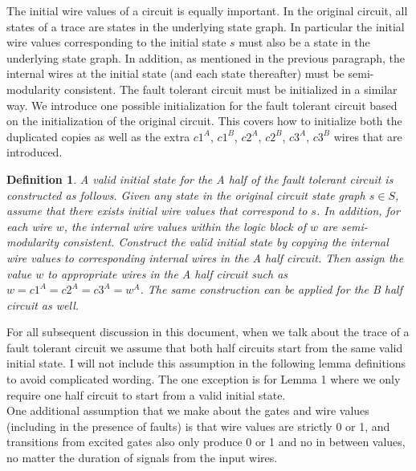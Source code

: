\documentclass[12pt]{report}
\newtheorem*{definition}{Definition}
\begin{document}
The initial wire values of a circuit is equally important.  In the original circuit, all states of a trace are states in the underlying state graph.  In particular the initial wire values corresponding to the initial state $s$ must also be a state in the underlying state graph.  In addition, as mentioned in the previous paragraph, the internal wires at the initial state (and each state thereafter) must be semi-modularity consistent.   The fault tolerant circuit must be initialized in a similar way.  We introduce one possible initialization for the fault tolerant circuit based on the initialization of the original circuit.  This covers how to initialize both the duplicated copies as well as the extra $c1^A$, $c1^B$, $c2^A$, $c2^B$, $c3^A$, $c3^B$ wires that are introduced.
\begin{definition} A {\em valid initial state} for the A half of the fault tolerant circuit is constructed as follows.  Given any state in the original circuit state graph $s \in S$, assume that there exists initial wire values that correspond to $s$.  In addition, for each wire $w$, the internal wire values within the logic block of $w$ are semi-modularity consistent.  Construct the valid initial state by copying the internal wire values to corresponding internal wires in the A half circuit.  Then assign the value $w$ to appropriate wires in the A half circuit such as $w=c1^A=c2^A=c3^A=w^A$. The same construction can be applied for the B half circuit as well.
\end{definition}
For all subsequent discussion in this document, when we talk about the trace of a fault tolerant circuit we assume that both half circuits start from the same valid initial state.  I will not include this assumption in the following lemma definitions to avoid complicated wording.  %
The one exception is for Lemma 1 where we only require one half circuit to start from a valid initial state.  \\

One additional assumption that we make about the gates and wire values (including in the presence of faults) is that wire values are strictly 0 or 1, and transitions from excited gates also only produce 0 or 1 and no in between values, no matter the duration of signals from the input wires.\\
\end{document}
